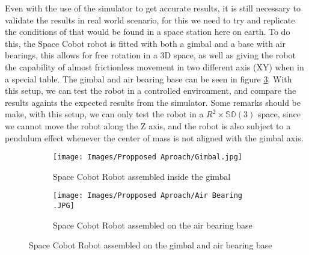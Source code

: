 Even with the use of the simulator to get accurate results, it is still necessary to validate the results in real world scenario, for this we need to try and replicate the conditions of that would be found in a space station here on earth. To do this, the Space Cobot robot is fitted with both a gimbal and a base with air bearings, this allows for free rotation in a 3D space, as well as giving the robot the capability of almost frictionless movement in two different axis (XY) when in a special table. The gimbal and air bearing base can be seen in figure \ref{fig:Proposed Approach: Real World: Gimbal and Air bearing base}. With this setup, we can test the robot in a controlled environment, and compare the results againts the expected results from the simulator. Some remarks should be make, with this setup, we can only test the robot in a $R^2 \times \mathbb{SO}(3)$ space, since we cannot move the robot along the Z axis, and the robot is also subject to a pendulum effect whenever the center of mass is not aligned with the gimbal axis. 

\begin{figure}[H]
    \begin{subfigure}{0.5\textwidth}
       \centering
       \texttt{[image: Images/Propposed Aproach/Gimbal.jpg]} 
       \caption{Space Cobot Robot assembled inside the gimbal}
       \label{fig: Proposed Approach: Real World: Gimbal}
    \end{subfigure}
    \hfill
    \begin{subfigure}{.5\textwidth}
        \centering
        \texttt{[image: Images/Propposed Aproach/Air Bearing .JPG]}
        \caption{Space Cobot Robot assembled on the air bearing base}
        \label{fig: Proposed Approach: Real Word: Air Bearings}
    \end{subfigure}
    \caption{Space Cobot Robot assembled on the gimbal and air bearing base}
    \label{fig:Proposed Approach: Real World: Gimbal and Air bearing base}
\end{figure}